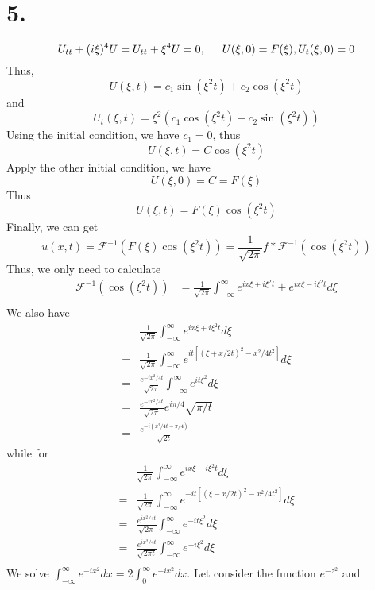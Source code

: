 \documentclass[11pt]{article}
\theoremstyle{mystyle}
\theoremstyle{definition}
\begin{document}
\section*{5.}
\[
  U_{tt} + (i\xi)^4 U = U_{tt} + \xi^4 U = 0, \indent U(\xi,0) = F(\xi), U_t(\xi,0) = 0
\]
Thus, 
\[
  U(\xi, t) = c_1 \sin(\xi^2 t) + c_2 \cos(\xi^2 t)
\]
and 
\[
  U_t(\xi,t) = \xi^2 (c_1 \cos(\xi^2 t) - c_2 \sin(\xi^2 t))
\]
Using the initial condition, we have $c_1 = 0$, thus 
\[
  U(\xi, t) = C \cos(\xi^2 t)
\]
Apply the other initial condition, we have 
\[
  U(\xi, 0) = C = F(\xi)
\]
Thus 
\[
  U(\xi, t) = F(\xi) \cos(\xi^2 t)
\]
Finally, we can get 
\[
  u(x,t) = \mathcal{F}^{-1}(F(\xi) \cos(\xi^2t)) = \displaystyle\frac{1}{\sqrt{2\pi}} f * \mathcal{F}^{-1}(\cos(\xi^2 t))
\]
Thus, we only need to calculate 
\begin{align*}
  \mathcal{F}^{-1}(\cos(\xi^2 t))
  &= \displaystyle\frac{1}{\sqrt{2\pi}} \int_{-\infty}^\infty e^{ix\xi + i\xi^2 t} + e^{ix \xi - i\xi^2t} d\xi \\
\end{align*}
We also have 
\begin{align*}
  &\displaystyle\frac{1}{\sqrt{2\pi}} \int_{-\infty}^\infty e^{ix\xi + i\xi^2 t} d\xi \\
  =&\displaystyle\frac{1}{\sqrt{2\pi}} \int_{-\infty}^\infty e^{it\left[(\xi + x/2t)^2 - x^2/4t^2\right] } d\xi \\
  =&\displaystyle\frac{e^{-ix^2/4t}}{\sqrt{2\pi}} \int_{-\infty}^\infty e^{it\xi^2}  d\xi \\
  =&\displaystyle\frac{e^{-ix^2/4t}}{\sqrt{2\pi}} e^{i\pi/4}\sqrt{\pi/t} \\
  =&\displaystyle\frac{e^{-i(x^2/4t - \pi/4)}}{\sqrt{2t}} 
\end{align*}
while for  
\begin{align*}
  &\displaystyle\frac{1}{\sqrt{2\pi}} \int_{-\infty}^\infty e^{ix\xi - i\xi^2 t} d\xi \\
  =&\displaystyle\frac{1}{\sqrt{2\pi}} \int_{-\infty}^\infty e^{-it\left[(\xi - x/2t)^2 - x^2/4t^2\right] } d\xi \\
  =&\displaystyle\frac{e^{ix^2/4t}}{\sqrt{2\pi}} \int_{-\infty}^\infty e^{-it\xi^2}  d\xi \\
  =&\displaystyle\frac{e^{ix^2/4t}}{\sqrt{2\pi t}} \int_{-\infty}^\infty e^{-i\xi^2}  d\xi \\
\end{align*}
We solve $\int_{-\infty}^\infty e^{-ix^2} dx = 2\int_0^\infty e^{-ix^2} dx$. 
Let consider the function $e^{-z^2}$ and 
\end{document}
